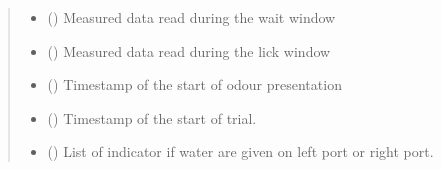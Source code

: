 \documentclass[letterpaper,10pt,english]{sphinxmanual}
\begin{document}
\begin{fulllineitems}
\begin{fulllineitems}
\begin{quote}
\begin{description}
\begin{itemize}
\item {} 
\sphinxAtStartPar
{} () \textendash{} Measured data read during the wait window

\item {} 
\sphinxAtStartPar
{} () \textendash{} Measured data read during the lick window

\item {} 
\sphinxAtStartPar
{} () \textendash{} Timestamp of the start of odour presentation

\item {} 
\sphinxAtStartPar
{} () \textendash{} Timestamp of the start of trial.

\item {} 
\sphinxAtStartPar
{} () \textendash{} List of indicator if water are given on left port or right port.

\end{itemize}


\end{description}\end{quote}

\end{fulllineitems}


\end{fulllineitems}

\end{document}
